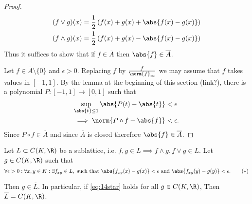 \documentclass{article}
\begin{document}
\begin{proof}
    \begin{align*}
        (f \vee g)(x) &= \frac{1}{2}\left(f(x) + g(x) + \abs{f(x) - g(x)}\right) \\
        (f \wedge g)(x) &= \frac{1}{2}\left(f(x) + g(x) - \abs{f(x) - g(x)}\right) \\
    \end{align*}
    Thus it suffices to show that if $f \in \overline{A}$ then $\abs{f} \in \overline{A}$.

    Let $f \in \overline{A} \setminus \{0\}$ and $\epsilon > 0$.
    Replacing $f$ by $\frac{f}{\norm{f}_\infty}$ we may assume that $f$ takes values in $[-1, 1]$.
    By the lemma at the beginning of this section (link?), there is a polynomial $P: [-1, 1] \to [0, 1]$ such that
    \begin{align*}
        \sup_{\abs{t} \leq 1} \abs{P(t) - \abs{t}} &< \epsilon \\
        \implies \norm{P \circ f - \abs{f}} &< \epsilon.
    \end{align*}
    Since $P \circ f \in \overline{A}$ and since $\overline{A}$ is closed therefore $\abs{f} \in \overline{A}$.
\end{proof}


\begin{lemma}
    Let $L \subset C(K, \R)$ be a sublattice, i.e. $f,g \in L \implies f \wedge g, f \vee g \in L$.
    Let $g \in C(K, \R)$ such that
    \begin{equation*}
        \forall \epsilon > 0: \forall x, y \in K: \exists f_{xy} \in L, \text{ such that } \abs{f_{xy}(x) - g(x)} < \epsilon \text{ and } \abs{f_{xy}(y) - g(y)} < \epsilon. \label{eq:14star} \tag{$*$}
    \end{equation*}

    Then $g \in \overline{L}$. In particular, if \eqref{eq:14star} holds for all $g \in C(K, \R)$, Then $\overline{L} = C(K, \R)$.
\end{lemma}
\end{document}
